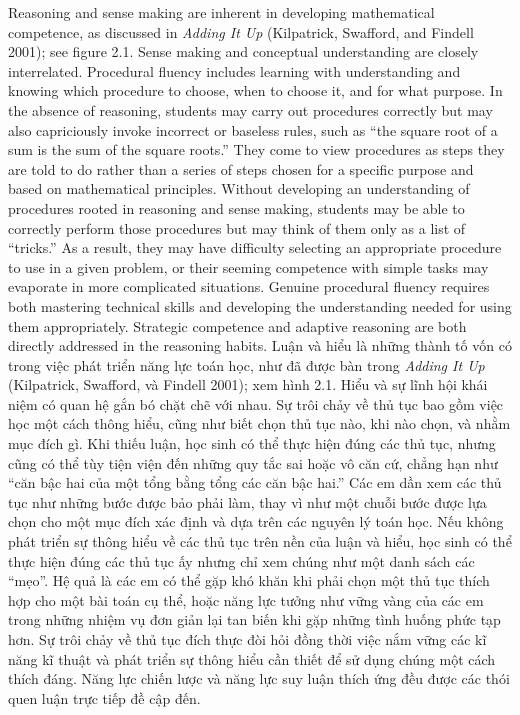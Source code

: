 \documentclass[
  10pt,
  a4paper,
  landscape,
  twoside,
  openany
]{scrbook}
\newcommand{\EN}[1]{#1}
\newcommand{\VI}[1]{#1}
\begin{document}
\TriPara
{
\EN{Reasoning and sense making are inherent in developing mathematical competence, as discussed in \emph{Adding It Up} (Kilpatrick, Swafford, and Findell 2001); see figure 2.1. Sense making and conceptual understanding are closely interrelated. Procedural fluency includes learning with understanding and knowing which procedure to choose, when to choose it, and for what purpose. In the absence of reasoning, students may carry out procedures correctly but may also capriciously invoke incorrect or baseless rules, such as ``the square root of a sum is the sum of the square roots.'' They come to view procedures as steps they are told to do rather than a series of steps chosen for a specific purpose and based on mathematical principles. Without developing an understanding of procedures rooted in reasoning and sense making, students may be able to correctly perform those procedures but may think of them only as a list of ``tricks.'' As a result, they may have difficulty selecting an appropriate procedure to use in a given problem, or their seeming competence with simple tasks may evaporate in more complicated situations. Genuine procedural fluency requires both mastering technical skills and developing the understanding needed for using them appropriately. Strategic competence and adaptive reasoning are both directly addressed in the reasoning habits. }
}
{
\VI{Luận và hiểu là những thành tố vốn có trong việc phát triển năng lực toán học, như đã được bàn trong \emph{Adding It Up} (Kilpatrick, Swafford, và Findell 2001); xem hình 2.1. Hiểu và sự lĩnh hội khái niệm có quan hệ gắn bó chặt chẽ với nhau. Sự trôi chảy về thủ tục bao gồm việc học một cách thông hiểu, cũng như biết chọn thủ tục nào, khi nào chọn, và nhằm mục đích gì. Khi thiếu luận, học sinh có thể thực hiện đúng các thủ tục, nhưng cũng có thể tùy tiện viện đến những quy tắc sai hoặc vô căn cứ, chẳng hạn như ``căn bậc hai của một tổng bằng tổng các căn bậc hai.'' Các em dần xem các thủ tục như những bước được bảo phải làm, thay vì như một chuỗi bước được lựa chọn cho một mục đích xác định và dựa trên các nguyên lý toán học. Nếu không phát triển sự thông hiểu về các thủ tục trên nền của luận và hiểu, học sinh có thể thực hiện đúng các thủ tục ấy nhưng chỉ xem chúng như một danh sách các ``mẹo''. Hệ quả là các em có thể gặp khó khăn khi phải chọn một thủ tục thích hợp cho một bài toán cụ thể, hoặc năng lực tưởng như vững vàng của các em trong những nhiệm vụ đơn giản lại tan biến khi gặp những tình huống phức tạp hơn. Sự trôi chảy về thủ tục đích thực đòi hỏi đồng thời việc nắm vững các kĩ năng kĩ thuật và phát triển sự thông hiểu cần thiết để sử dụng chúng một cách thích đáng. Năng lực chiến lược và năng lực suy luận thích ứng đều được các thói quen luận trực tiếp đề cập đến.}
}
\end{document}
